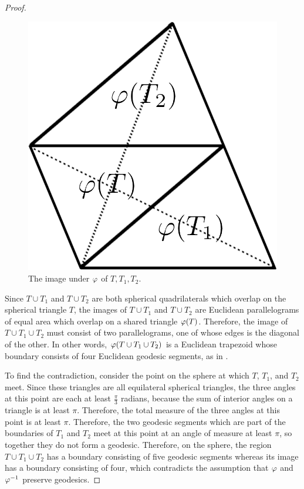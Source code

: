 \begin{proof}
		
\begin{figure}[h]
	\centering
	\includegraphics[width=.25\textwidth]{figs/spheretri_plane.png}
	\caption{The image under $\varphi$ of $T,T_1,T_2$.}
	\label{fig:sphtris_pl}
\end{figure}

Since $T\cup T_1$ and $T\cup T_2$ are both spherical quadrilaterals which overlap on the spherical triangle $T$, the images of $T\cup T_1$ and $T\cup T_2$ are Euclidean parallelograms of equal area which overlap on a shared triangle $\varphi(T)$.
	Therefore, the image of $T\cup T_1\cup T_2$ must 
	consist of two parallelograms, one of whose 
	edges is the diagonal of the other. In other words, 
	$\varphi(T\cup T_1\cup T_2)$ is a Euclidean trapezoid 
	whose boundary consists of four Euclidean geodesic 
	segments, as in .
	
	To find the contradiction, consider the point on the sphere at which $T$, $T_1$, and $T_2$ meet.  Since these triangles are all equilateral spherical triangles, the three angles at this point are each at least $\tfrac{\pi}{3}$ radians, because the sum of interior angles on a triangle is at least $\pi$.  Therefore, the total measure of the three angles at this point is at least $\pi$.  Therefore, the two geodesic segments which are part of the boundaries of $T_1$ and $T_2$ meet at this point at an angle of measure at least $\pi$, so together they do not form a geodesic.  Therefore, on the sphere, the region $T\cup T_1\cup T_2$ has a boundary consisting of five geodesic segments whereas its image has a boundary consisting of four, which contradicts the assumption that $\varphi$ and $\varphi^{-1}$ preserve geodesics.
\end{proof}


